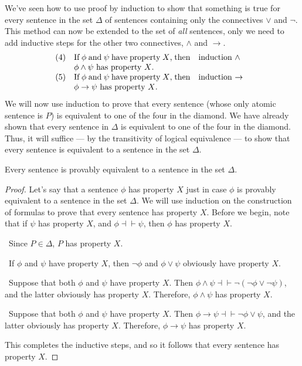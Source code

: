 We've seen how to use proof by induction to show that something is
true for every sentence in the set $\Delta$ of sentences containing only
the connectives $\vee$ and $\neg$.  This method can now be extended to
the set of {\it all} sentences, only we need to add inductive steps
for the other two connectives, $\wedge$ and $\to$.
\[ \begin{array}{c p{5cm} p{2.2cm}}
(4) & If $\phi$ and $\psi$ have property $X$, then $\phi\wedge\psi$ has
     property $X$. & induction $\wedge$ \\
(5) & If $\phi$ and $\psi$ have property $X$, then $\phi\to\psi$ has
     property $X$.  & induction $\to$ \end{array} \]
We will now use induction to prove that every sentence (whose only
atomic sentence is $P$) is equivalent to one of the four in the
diamond.  We have already shown that every sentence in $\Delta$ is
equivalent to one of the four in the diamond.  Thus, it will suffice
--- by the transitivity of logical equivalence --- to show that every
sentence is equivalent to a sentence in the set $\Delta$.     
 
\begin{prop} Every sentence is provably equivalent to a sentence in
  the set $\Delta$.  \end{prop}

\begin{proof} Let's say that a sentence $\phi$ has property $X$ just
  in case $\phi$ is provably equivalent to a sentence in the set
  $\Delta$.  We will use induction on the construction of formulas to
  prove that every sentence has property $X$.  Before we begin, note
  that if $\psi$ has property $X$, and \mbox{$\phi\dashv\vdash\psi$},
  then $\phi$ has property $X$.

  \bigskip \noindent {} \, Since $P\in\Delta$, $P$ has
  property $X$.

  \bigskip \noindent {} \, If $\phi$
  and $\psi$ have property $X$, then $\neg \phi$ and $\phi\vee\psi$
  obviously have property $X$.

  \bigskip \noindent {} \, Suppose that both
  $\phi$ and $\psi$ have property $X$.  Then
  $\phi\wedge\psi\dashv\vdash\neg (\neg\phi\vee\neg\psi )$, and the latter
  obviously has property $X$.  Therefore, $\phi\wedge\psi$ has
  property $X$.

  \bigskip \noindent {} \, Suppose that both
  $\phi$ and $\psi$ have property $X$.  Then
  $\phi\to\psi\dashv\vdash\neg\phi\vee\psi$, and the latter obviously has
  property $X$.  Therefore, $\phi\to\psi$ has property $X$.

  \bigskip \noindent This completes the inductive steps, and so it
  follows that every sentence has property $X$.
\end{proof}

